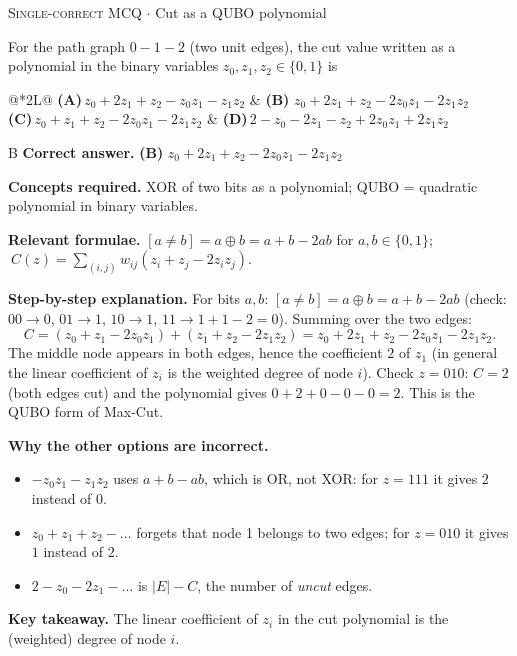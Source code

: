 \documentclass[11pt,a4paper]{article}
\newcommand{\optlabel}[1]{\textbf{(#1)}}
\newcommand{\correctlabel}[1]{\textcolor{okgreen}{\textbf{(#1)}\,\ding{51}}}
\newenvironment{qitem}[1]{\begin{list}{}{\setlength{\leftmargin}{3.3em}\setlength{\labelwidth}{3.1em}%
  \setlength{\labelsep}{0.2em}\setlength{\topsep}{3pt}\setlength{\parsep}{3pt}}\item[\textbf{Q.#1}\hfill]}{\end{list}}
\newcommand{\qsep}{\par\vspace{2pt}{\color{black!15}\hrule}\vspace{4pt}}
\newcommand{\qmeta}[2]{{\footnotesize\color{black!60}\textsc{#1} \;$\cdot$\; #2}\par}
\begin{document}
\begin{qitem}{4}
\qmeta{Single-correct MCQ}{Cut as a QUBO polynomial}
For the path graph $0 - 1 - 2$ (two unit edges), the cut value written as a polynomial in the binary variables
$z_0, z_1, z_2 \in \{0, 1\}$ is
\par\smallskip\noindent\begin{tabularx}{\linewidth}{@{}*{2}{L}@{}}
\optlabel{A}\,$z_0 + 2z_1 + z_2 - z_0z_1 - z_1z_2$ & \correctlabel{B}\,$z_0 + 2z_1 + z_2 - 2z_0z_1 - 2z_1z_2$ \\[3pt]
\optlabel{C}\,$z_0 + z_1 + z_2 - 2z_0z_1 - 2z_1z_2$ & \optlabel{D}\,$2 - z_0 - 2z_1 - z_2 + 2z_0z_1 + 2z_1z_2$
\end{tabularx}
\end{qitem}
\begin{solbox}{B}
\textbf{\color{brand}Correct answer.} \textcolor{okgreen}{\textbf{(B)}} $z_0 + 2z_1 + z_2 - 2z_0z_1 - 2z_1z_2$

\textbf{\color{brand}Concepts required.} XOR of two bits as a polynomial; QUBO = quadratic polynomial in binary variables.

\textbf{\color{brand}Relevant formulae.} $[a\neq b] = a \oplus b = a + b - 2ab$ for $a, b\in\{0,1\}$; $\ C(z) = \sum_{(i,j)} w_{ij}(z_i + z_j - 2z_iz_j)$.

\textbf{\color{brand}Step-by-step explanation.} For bits $a, b$: $[a \neq b] = a \oplus b = a + b - 2ab$ (check: $00 \to 0$, $01 \to 1$, $10 \to 1$, $11 \to 1 + 1 - 2 = 0$).
Summing over the two edges:
\[ C = (z_0 + z_1 - 2z_0z_1) + (z_1 + z_2 - 2z_1z_2) = z_0 + 2z_1 + z_2 - 2z_0z_1 - 2z_1z_2 . \]
The middle node appears in both edges, hence the coefficient $2$ of $z_1$ (in general the linear coefficient of $z_i$ is
the weighted degree of node $i$). Check $z = 010$: $C = 2$ (both edges cut) and the polynomial gives $0 + 2 + 0 - 0 - 0 = 2$.
This is the QUBO form of Max-Cut.

\textbf{\color{brand}Why the other options are incorrect.}
\begin{itemize}[leftmargin=2.4em, itemsep=1pt, topsep=2pt]
\item[\textbf{(A)}] $-z_0z_1 - z_1z_2$ uses $a + b - ab$, which is OR, not XOR: for $z = 111$ it gives $2$ instead of $0$.
\item[\textbf{(C)}] $z_0 + z_1 + z_2 - \dots$ forgets that node 1 belongs to two edges; for $z = 010$ it gives $1$ instead of $2$.
\item[\textbf{(D)}] $2 - z_0 - 2z_1 - \dots$ is $|E| - C$, the number of \emph{uncut} edges.
\end{itemize}
\textbf{\color{brand}Key takeaway.} The linear coefficient of $z_i$ in the cut polynomial is the (weighted) degree of node $i$.
\end{solbox}
\qsep
\end{document}
